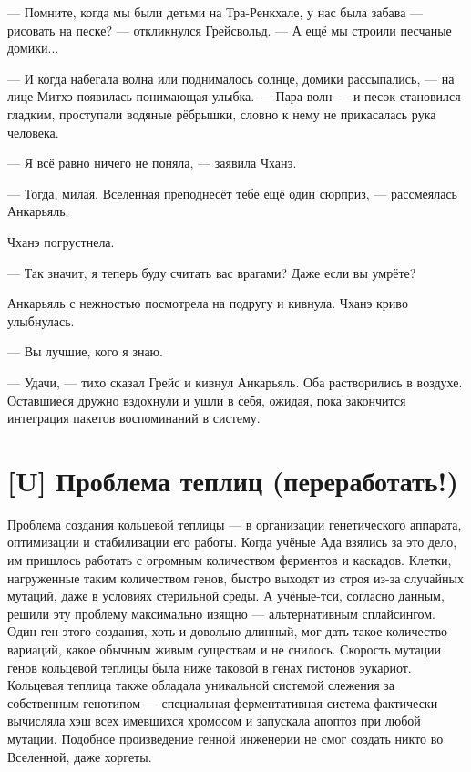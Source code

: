 --- Помните, когда мы были детьми на Тра-Ренкхале, у нас была забава --- рисовать на песке? --- откликнулся Грейсвольд.
--- А ещё мы строили песчаные домики...

--- И когда набегала волна или поднималось солнце, домики рассыпались, --- на лице Митхэ появилась понимающая улыбка.
--- Пара волн --- и песок становился гладким, проступали водяные рёбрышки, словно к нему не прикасалась рука человека.

--- Я всё равно ничего не поняла, --- заявила Чханэ.

--- Тогда, милая, Вселенная преподнесёт тебе ещё один сюрприз, --- рассмеялась Анкарьяль.

Чханэ погрустнела.

--- Так значит, я теперь буду считать вас врагами?
Даже если вы умрёте?

Анкарьяль с нежностью посмотрела на подругу и кивнула.
Чханэ криво улыбнулась.

--- Вы лучшие, кого я знаю.

--- Удачи, --- тихо сказал Грейс и кивнул Анкарьяль.
Оба растворились в воздухе.
Оставшиеся дружно вздохнули и ушли в себя, ожидая, пока закончится интеграция пакетов воспоминаний в систему.

\section{[U] Проблема теплиц (переработать!)}

\textspace

Проблема создания кольцевой теплицы --- в организации генетического аппарата, оптимизации и стабилизации его работы.
Когда учёные Ада взялись за это дело, им пришлось работать с огромным количеством ферментов и каскадов.
Клетки, нагруженные таким количеством генов, быстро выходят из строя из-за случайных мутаций, даже в условиях стерильной среды.
А учёные-тси, согласно данным, решили эту проблему максимально изящно --- альтернативным сплайсингом.
Один ген этого создания, хоть и довольно длинный, мог дать такое количество вариаций, какое обычным живым существам и не снилось.
Скорость мутации генов кольцевой теплицы была ниже таковой в генах гистонов эукариот.
Кольцевая теплица также обладала уникальной системой слежения за собственным генотипом --- специальная ферментативная система фактически вычисляла хэш всех имевшихся хромосом и запускала апоптоз при любой мутации.
Подобное произведение генной инженерии не смог создать никто во Вселенной, даже хоргеты.

